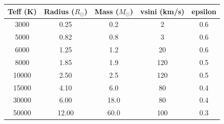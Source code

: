 \begin{table}[ht]
\centering
\begin{tabular}{ccccc}
\toprule
Teff (K) & Radius ($R_\odot$) & Mass ($M_\odot$) & vsini (km/s) & epsilon \\
\midrule
3000 & 0.25 & 0.2 & 2 & 0.6 \\
5000 & 0.82 & 0.8 & 3 & 0.6 \\
6000 & 1.25 & 1.2 & 20 & 0.6 \\
8000 & 1.85 & 1.9 & 120 & 0.5 \\
10000 & 2.50 & 2.5 & 120 & 0.5 \\
15000 & 4.10 & 6.0 & 80 & 0.4 \\
30000 & 6.00 & 18.0 & 80 & 0.4 \\
50000 & 12.00 & 60.0 & 100 & 0.3 \\
\bottomrule
\end{tabular}
\end{table}